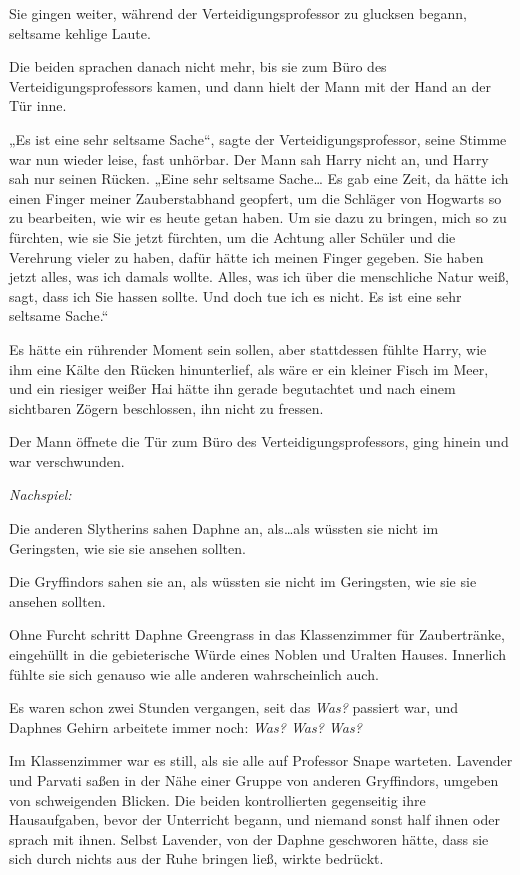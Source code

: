 {Sie gingen weiter, während der Verteidigungsprofessor zu glucksen begann, seltsame kehlige Laute.

Die beiden sprachen danach nicht mehr, bis sie zum Büro des Verteidigungsprofessors kamen, und dann hielt der Mann mit der Hand an der Tür inne.

„Es ist eine sehr seltsame Sache“, sagte der Verteidigungsprofessor, seine Stimme war nun wieder leise, fast unhörbar. Der Mann sah Harry nicht an, und Harry sah nur seinen Rücken. „Eine sehr seltsame Sache… Es gab eine Zeit, da hätte ich einen Finger meiner Zauberstabhand geopfert, um die Schläger von Hogwarts so zu bearbeiten, wie wir es heute getan haben. Um sie dazu zu bringen, mich so zu fürchten, wie sie Sie jetzt fürchten, um die Achtung aller Schüler und die Verehrung vieler zu haben, dafür hätte ich meinen Finger gegeben. Sie haben jetzt alles, was ich damals wollte. Alles, was ich über die menschliche Natur weiß, sagt, dass ich Sie hassen sollte. Und doch tue ich es nicht. Es ist eine sehr seltsame Sache.“

Es hätte ein rührender Moment sein sollen, aber stattdessen fühlte Harry, wie ihm eine Kälte den Rücken hinunterlief, als wäre er ein kleiner Fisch im Meer, und ein riesiger weißer Hai hätte ihn gerade begutachtet und nach einem sichtbaren Zögern beschlossen, ihn nicht zu fressen.

Der Mann öffnete die Tür zum Büro des Verteidigungsprofessors, ging hinein und war verschwunden.

\emph{\emph{Nachspiel:}}

Die anderen Slytherins sahen Daphne an, als…als wüssten sie nicht im Geringsten, wie sie sie ansehen sollten.

Die Gryffindors sahen sie an, als wüssten sie nicht im Geringsten, wie sie sie ansehen sollten.

Ohne Furcht schritt Daphne Greengrass in das Klassenzimmer für Zaubertränke, eingehüllt in die gebieterische Würde eines Noblen und Uralten Hauses. Innerlich fühlte sie sich genauso wie alle anderen wahrscheinlich auch.

Es waren schon zwei Stunden vergangen, seit das \emph{Was?} passiert war, und Daphnes Gehirn arbeitete immer noch: \emph{Was? Was? Was?}

Im Klassenzimmer war es still, als sie alle auf Professor Snape warteten. Lavender und Parvati saßen in der Nähe einer Gruppe von anderen Gryffindors, umgeben von schweigenden Blicken. Die beiden kontrollierten gegenseitig ihre Hausaufgaben, bevor der Unterricht begann, und niemand sonst half ihnen oder sprach mit ihnen. Selbst Lavender, von der Daphne geschworen hätte, dass sie sich durch nichts aus der Ruhe bringen ließ, wirkte bedrückt.

}
